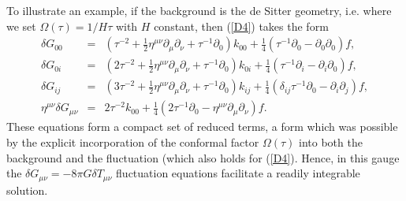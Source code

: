 To illustrate an example, if the background is the de Sitter geometry, i.e. where we set $\Omega(\tau)=1/H\tau$ with $H$ constant, then (\ref{D4}) takes the form
%
\begin{eqnarray}
\delta G_{00}&=&
(\tau^{-2} + \tfrac{1}{2} \eta^{\mu \nu} \partial_{\mu} \partial_{\nu} + \tau^{-1} \partial_{0}) k_{00} + \tfrac{1}{4} (\tau^{-1} \partial_{0} -   \partial_{0} \partial_{0}) f,
\nonumber\\
\delta G_{0i}&=&
(2 \tau^{-2} + \tfrac{1}{2} \eta^{\mu \nu} \partial_{\mu} \partial_{\nu} + \tau^{-1} \partial_{0}) k_{0i} + \tfrac{1}{4} ( \tau^{-1} \partial_{i} -  \partial_{i} \partial_{0}) f,
\nonumber\\
\delta G_{ij}&=&
(3 \tau^{-2} + \tfrac{1}{2} \eta^{\mu \nu} \partial_{\mu} \partial_{\nu} + \tau^{-1} \partial_{0}) k_{ij} + \tfrac{1}{4} (\delta_{ij} \tau^{-1} \partial_{0} -   \partial_{i} \partial_{j}) f,
\nonumber\\
\eta^{\mu\nu}\delta G_{\mu\nu}&=&2\tau^{-2}k_{00}+ \tfrac{1}{4}  (2\tau^{-1}\partial_{0} -\eta^{\mu\nu}\partial_{\mu}\partial_{\nu}) f.
\label{D5}
\end{eqnarray}
%
These equations form a compact set of reduced terms, a form which was possible by the explicit incorporation of the conformal factor $\Omega(\tau)$ into both the background and the fluctuation (which also holds for (\ref{D4}). Hence, in this gauge the $\delta G_{\mu\nu}=-8\pi G \delta T_{\mu\nu}$ fluctuation equations facilitate a readily integrable solution.

